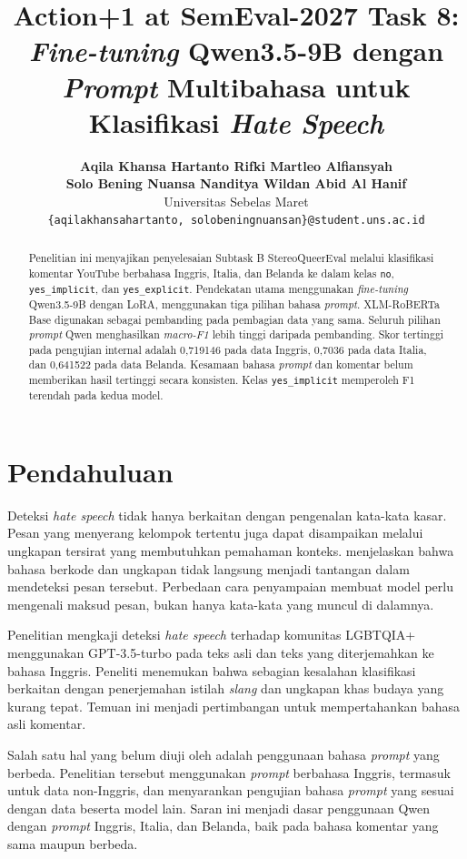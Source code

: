 \documentclass[11pt]{article}
\title{Action+1 at SemEval-2027 Task 8: \textit{Fine-tuning} Qwen3.5-9B dengan \textit{Prompt} Multibahasa untuk Klasifikasi \textit{Hate Speech}}
\author{\textbf{Aqila Khansa Hartanto \quad Rifki Martleo Alfiansyah} \\
\textbf{Solo Bening Nuansa Nanditya \quad Wildan Abid Al Hanif} \\
Universitas Sebelas Maret \\
\texttt{\{aqilakhansahartanto, solobeningnuansan\}@student.uns.ac.id}}
\renewcommand{\abstractname}{Abstrak}
\begin{document}
\renewcommand{\abstractname}{Abstrak}
\pagestyle{plain}
\raggedbottom
\maketitle
\begin{abstract}
Penelitian ini menyajikan penyelesaian Subtask B StereoQueerEval melalui klasifikasi komentar YouTube berbahasa Inggris, Italia, dan Belanda ke dalam kelas \texttt{no}, \texttt{yes\_implicit}, dan \texttt{yes\_explicit}. Pendekatan utama menggunakan \textit{fine-tuning} Qwen3.5-9B dengan LoRA, menggunakan tiga pilihan bahasa \textit{prompt}. XLM-RoBERTa Base digunakan sebagai pembanding pada pembagian data yang sama. Seluruh pilihan \textit{prompt} Qwen menghasilkan \textit{macro-F1} lebih tinggi daripada pembanding. Skor tertinggi pada pengujian internal adalah 0,719146 pada data Inggris, 0,7036 pada data Italia, dan 0,641522 pada data Belanda. Kesamaan bahasa \textit{prompt} dan komentar belum memberikan hasil tertinggi secara konsisten. Kelas \texttt{yes\_implicit} memperoleh F1 terendah pada kedua model.
\end{abstract}

\section{Pendahuluan}
\label{sec:pendahuluan}

Deteksi \textit{hate speech} tidak hanya berkaitan dengan pengenalan kata-kata kasar. Pesan yang menyerang kelompok tertentu juga dapat disampaikan melalui ungkapan tersirat yang membutuhkan pemahaman konteks. \citet{elsherief-etal-2021-latent} menjelaskan bahwa bahasa berkode dan ungkapan tidak langsung menjadi tantangan dalam mendeteksi pesan tersebut. Perbedaan cara penyampaian membuat model perlu mengenali maksud pesan, bukan hanya kata-kata yang muncul di dalamnya.

Penelitian \citet{chan-etal-2024-hate} mengkaji deteksi \textit{hate speech} terhadap komunitas LGBTQIA+ menggunakan GPT-3.5-turbo pada teks asli dan teks yang diterjemahkan ke bahasa Inggris. Peneliti menemukan bahwa sebagian kesalahan klasifikasi berkaitan dengan penerjemahan istilah \textit{slang} dan ungkapan khas budaya yang kurang tepat. Temuan ini menjadi pertimbangan untuk mempertahankan bahasa asli komentar.

Salah satu hal yang belum diuji oleh \citet{chan-etal-2024-hate} adalah penggunaan bahasa \textit{prompt} yang berbeda. Penelitian tersebut menggunakan \textit{prompt} berbahasa Inggris, termasuk untuk data non-Inggris, dan menyarankan pengujian bahasa \textit{prompt} yang sesuai dengan data beserta model lain. Saran ini menjadi dasar penggunaan Qwen dengan \textit{prompt} Inggris, Italia, dan Belanda, baik pada bahasa komentar yang sama maupun berbeda.
\end{document}
